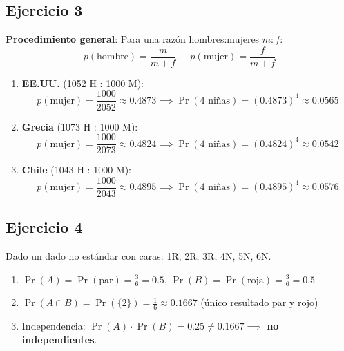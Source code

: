 \documentclass{article}
\begin{document}
	\subsection*{Ejercicio 3}
	\textbf{Procedimiento general}: Para una razón hombres:mujeres \( m:f \):
	\[
	p(\text{hombre}) = \frac{m}{m+f}, \quad p(\text{mujer}) = \frac{f}{m+f}
	\]
	
	\begin{enumerate}[label=\alph*)]
		\item \textbf{EE.UU.} (1052 H : 1000 M):
		\[
		p(\text{mujer}) = \frac{1000}{2052} \approx 0.4873 \implies \Pr(\text{4 niñas}) = (0.4873)^4 \approx 0.0565
		\]
		
		\item \textbf{Grecia} (1073 H : 1000 M):
		\[
		p(\text{mujer}) = \frac{1000}{2073} \approx 0.4824 \implies \Pr(\text{4 niñas}) = (0.4824)^4 \approx 0.0542
		\]
		
		\item \textbf{Chile} (1043 H : 1000 M):
		\[
		p(\text{mujer}) = \frac{1000}{2043} \approx 0.4895 \implies \Pr(\text{4 niñas}) = (0.4895)^4 \approx 0.0576
		\]
	\end{enumerate}
	
	\subsection*{Ejercicio 4}
	Dado un dado no estándar con caras: 1R, 2R, 3R, 4N, 5N, 6N.
	\begin{enumerate}[label=\alph*)]
		\item \( \Pr(A) = \Pr(\text{par}) = \frac{3}{6} = 0.5 \), \( \Pr(B) = \Pr(\text{roja}) = \frac{3}{6} = 0.5 \)
		
		\item \( \Pr(A \cap B) = \Pr(\{2\}) = \frac{1}{6} \approx 0.1667 \) (único resultado par y rojo)
		
		\item Independencia: \( \Pr(A) \cdot \Pr(B) = 0.25 \neq 0.1667 \implies \) \textbf{no independientes}.
	\end{enumerate}
	
\end{document}
